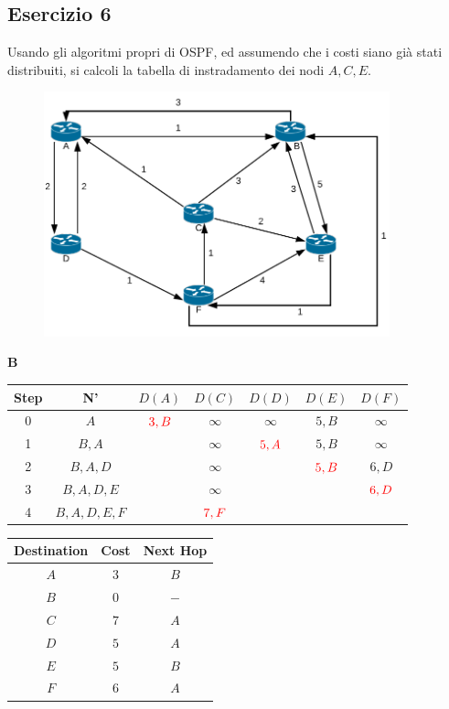 \documentclass[10pt]{article}
\begin{document}
	\newpage
	
	\subsection{Esercizio 6}
	Usando gli algoritmi propri di OSPF, ed assumendo che i costi siano già stati distribuiti, si calcoli la tabella di instradamento dei nodi ${A,C,E}$.
	\begin{figure}[h]
	\centering
	\includegraphics[width=10cm]{es6}
	\end{figure}
	\begin{center}
	 	\textbf{B}
 		\begin{tabular}{||c c c c c c c||} 
 			\hline
 			Step & N' & $D(A)$ & $D(C)$ & $D(D)$ & $D(E)$ & $D(F)$ \\[0.5ex] 
 			\hline\hline
 			0 & $A$ & $\color{red} 3,B$ & $\infty$ & $\infty$ & $5,B$ & $\infty$ \\
 			\hline
 			1 & $B,A$ & & $\infty$ & $\color{red} 5,A$ & $5,B$ & $\infty$ \\
 			\hline
 			2 & $B,A,D$ & & $\infty$ & & $\color{red} 5,B$ & $6,D$ \\
 			\hline
 			3 & $B,A,D,E$ & & $\infty$ & & & $\color{red} 6,D$ \\
 			\hline
 			4 & $B,A,D,E,F$ & & $\color{red} 7,F$ & & & \\
 			\hline
		\end{tabular}
		\quad
		\begin{tabular}{||c || c || c||}
			\hline
 			Destination & Cost & Next Hop\\[0.5ex] 
 			\hline\hline
			$A$ & $3$ & $B$\\
			$B$ & $0$ & $-$\\
 			$C$ & $7$ & $A$\\
			$D$ & $5$ & $A$\\
			$E$ & $5$ & $B$\\
			$F$ & $6$ & $A$\\[0.5ex]
			\hline
		\end{tabular}
	\end{center}
	
\end{document}

